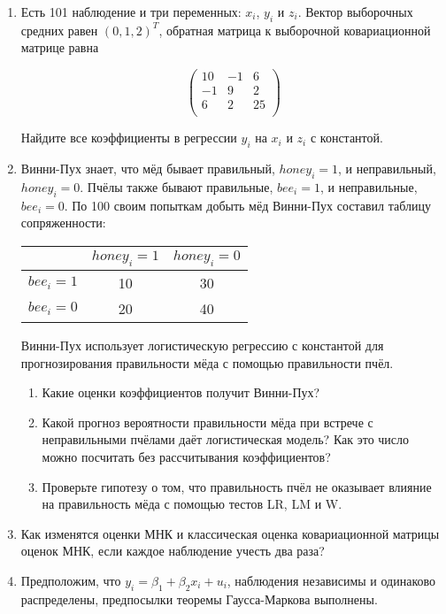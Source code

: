 \documentclass[12pt]{article} %
\theoremstyle{definition} %
\begin{document}
\begin{enumerate}
\item Есть 101 наблюдение и три переменных: $x_i$, $y_i$ и $z_i$. 
Вектор выборочных средних равен $(0, 1, 2)^T$, 
обратная матрица к выборочной ковариационной матрице равна 

\[
\begin{pmatrix}
  10 & -1 & 6 \\
  -1 & 9 & 2 \\
  6  & 2 & 25 \\
\end{pmatrix}
\]

Найдите все коэффициенты в регрессии $y_i$ на $x_i$ и $z_i$ с константой. 

\newpage
\item Винни-Пух знает, что мёд бывает правильный, $honey_i=1$, и неправильный, $honey_i=0$. Пчёлы также бывают правильные, $bee_i=1$, и неправильные, $bee_i=0$. По 100 своим попыткам добыть мёд Винни-Пух составил таблицу сопряженности:

\begin{tabular}{c|cc}
\toprule
 & $honey_i=1$ & $honey_i=0$ \\
\midrule
$bee_i=1$ & 10 & 30 \\
$bee_i=0$ & 20 & 40 \\
\bottomrule
\end{tabular}

Винни-Пух использует логистическую регрессию с константой для прогнозирования правильности мёда с помощью правильности пчёл.

\begin{enumerate}
\item Какие оценки коэффициентов получит Винни-Пух?
\item Какой прогноз вероятности правильности мёда при встрече с неправильными пчёлами даёт логистическая модель? Как это число можно посчитать без рассчитывания коэффициентов?
\item Проверьте гипотезу о том, что правильность пчёл не оказывает влияние на правильность мёда с помощью тестов LR, LM и W.
\end{enumerate}


\item Как изменятся оценки МНК и классическая оценка ковариационной матрицы оценок МНК, 
если каждое наблюдение учесть два раза?


\item Предположим, что $y_i= \beta_1 + \beta_2 x_i + u_i$, наблюдения независимы и одинаково распределены, 
предпосылки теоремы Гаусса-Маркова выполнены.


\end{enumerate}
\end{document}
